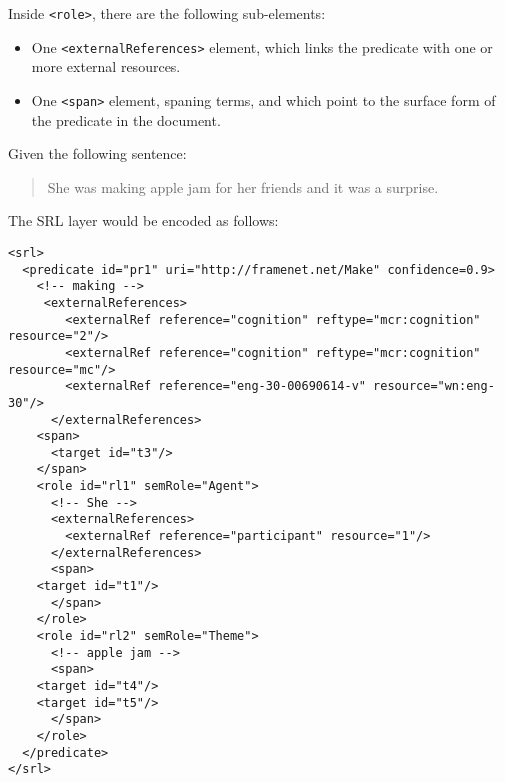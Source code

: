 Inside \texttt{<role>}, there are the following sub-elements:
\begin{itemize}
\item One \texttt{<externalReferences>} element, which links the predicate
  with one or more external resources.
\item One \texttt{<span>} element, spaning terms, and which point to the
  surface form of the predicate in the document.
\end{itemize}

Given the following sentence:

\begin{quote}
  She was making apple jam for her friends and it was a surprise.
\end{quote}

The SRL layer would be encoded as follows:

\begin{Verbatim}[fontsize=\small]
<srl>
  <predicate id="pr1" uri="http://framenet.net/Make" confidence=0.9>
    <!-- making -->
     <externalReferences>
        <externalRef reference="cognition" reftype="mcr:cognition" resource="2"/>
        <externalRef reference="cognition" reftype="mcr:cognition" resource="mc"/>
        <externalRef reference="eng-30-00690614-v" resource="wn:eng-30"/>
      </externalReferences>
    <span>
      <target id="t3"/>
    </span>
    <role id="rl1" semRole="Agent">
      <!-- She -->
      <externalReferences>
        <externalRef reference="participant" resource="1"/>
      </externalReferences>
      <span>
	<target id="t1"/>
      </span>
    </role>
    <role id="rl2" semRole="Theme">
      <!-- apple jam -->
      <span>
	<target id="t4"/>
	<target id="t5"/>
      </span>
    </role>
  </predicate>
</srl>
\end{Verbatim}



